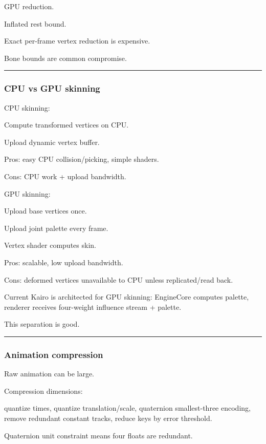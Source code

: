GPU reduction.

Inflated rest bound.

Exact per-frame vertex reduction is expensive.

Bone bounds are common compromise.

\begin{center}\rule{0.5\linewidth}{0.5pt}\end{center}

\subsubsection{CPU vs GPU skinning}\label{cpu-vs-gpu-skinning}

CPU skinning:

Compute transformed vertices on CPU.

Upload dynamic vertex buffer.

Pros: easy CPU collision/picking, simple shaders.

Cons: CPU work + upload bandwidth.

GPU skinning:

Upload base vertices once.

Upload joint palette every frame.

Vertex shader computes skin.

Pros: scalable, low upload bandwidth.

Cons: deformed vertices unavailable to CPU unless replicated/read back.

Current Kairo is architected for GPU skinning: EngineCore computes palette, renderer receives four-weight influence stream + palette.

This separation is good.

\begin{center}\rule{0.5\linewidth}{0.5pt}\end{center}

\subsubsection{Animation compression}\label{animation-compression}

Raw animation can be large.

Compression dimensions:

quantize times, quantize translation/scale, quaternion smallest-three encoding, remove redundant constant tracks, reduce keys by error threshold.

Quaternion unit constraint means four floats are redundant.

